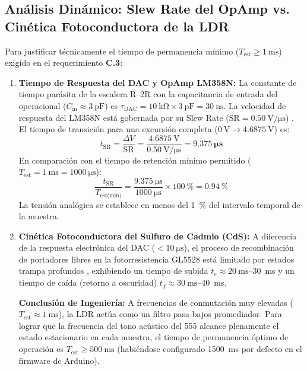 \documentclass[11pt,letterpaper]{article}
\begin{document}
\subsection{Análisis Dinámico: Slew Rate del OpAmp vs. Cinética Fotoconductora de la LDR}
Para justificar técnicamente el tiempo de permanencia mínimo ($T_{\text{est}} \ge \SI{1}{\milli\second}$) exigido en el requerimiento \textbf{C.3}:
\begin{enumerate}
    \item \textbf{Tiempo de Respuesta del DAC y OpAmp LM358N:}
    La constante de tiempo parásita de la escalera R--2R con la capacitancia de entrada del operacional ($C_{\text{in}} \approx \SI{3}{\pico\farad}$) es $\tau_{\text{DAC}} = \SI{10}{\kilo\ohm} \times \SI{3}{\pico\farad} = \SI{30}{\nano\second}$. La velocidad de respuesta del LM358N está gobernada por su Slew Rate ($\mathrm{SR} = \SI{0.50}{\volt\per\micro\second}$) \cite{ti_lm358}. El tiempo de transición para una excursión completa ($\SI{0}{\volt} \to \SI{4.6875}{\volt}$) es:
    \begin{equation}
    t_{\text{SR}} = \frac{\Delta V}{\mathrm{SR}} = \frac{\SI{4.6875}{\volt}}{\SI{0.50}{\volt\per\micro\second}} = \mathbf{\SI{9.375}{\micro\second}}
    \end{equation}
    En comparación con el tiempo de retención mínimo permitido ($T_{\text{est}} = \SI{1}{\milli\second} = \SI{1000}{\micro\second}$):
    \begin{equation}
    \frac{t_{\text{SR}}}{T_{\text{est(min)}}} = \frac{\SI{9.375}{\micro\second}}{\SI{1000}{\micro\second}} \times \SI{100}{\percent} = \mathbf{\SI{0.94}{\percent}}
    \end{equation}
    La tensión analógica se establece en menos del \SI{1}{\percent} del intervalo temporal de la muestra.
    \item \textbf{Cinética Fotoconductora del Sulfuro de Cadmio (CdS):}
    A diferencia de la respuesta electrónica del DAC ($< \SI{10}{\micro\second}$), el proceso de recombinación de portadores libres en la fotorresistencia GL5528 está limitado por estados trampa profundos \cite{rose1963}, exhibiendo un tiempo de subida $t_r \approx \SI{20}{\milli\second}$--\SI{30}{\milli\second} y un tiempo de caída (retorno a oscuridad) $t_f \approx \SI{30}{\milli\second}$--\SI{40}{\milli\second}.
    
    \textbf{Conclusión de Ingeniería:} A frecuencias de conmutación muy elevadas ($T_{\text{est}} \approx \SI{1}{\milli\second}$), la LDR actúa como un filtro pasa-bajos promediador. Para lograr que la frecuencia del tono acústico del 555 alcance plenamente el estado estacionario en cada muestra, el tiempo de permanencia óptimo de operación es $T_{\text{est}} \ge \SI{500}{\milli\second}$ (habiéndose configurado \SI{1500}{\milli\second} por defecto en el firmware de Arduino).
\end{enumerate}
\end{document}
